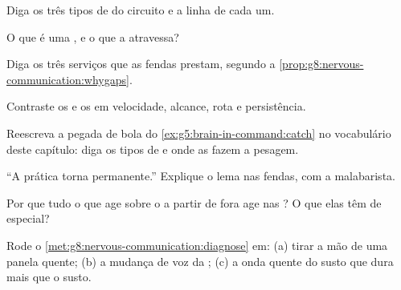 \begin{exercise}[$\star$]\label{exo:g8:nervous-communication:3}
Diga os três tipos de  do circuito e a linha de cada um.
\end{exercise}

\begin{exercise}[$\star$]\label{exo:g8:nervous-communication:4}
O que é uma , e o que a atravessa?
\end{exercise}

\begin{exercise}[$\star$]\label{exo:g8:nervous-communication:5}
Diga os três serviços que as fendas prestam, segundo a
\cref{prop:g8:nervous-communication:whygaps}.
\end{exercise}

\begin{exercise}[$\star$]\label{exo:g8:nervous-communication:6}
Contraste os  e os  em velocidade, alcance, rota e
persistência.
\end{exercise}

\begin{exercise}[$\star\star$]\label{exo:g8:nervous-communication:7}
Reescreva a pegada de bola do \cref{ex:g5:brain-in-command:catch} no
vocabulário deste capítulo: diga os tipos de  e onde as
 fazem a pesagem.
\end{exercise}

\begin{exercise}[$\star\star$]\label{exo:g8:nervous-communication:8}
``A prática torna permanente.'' Explique o lema nas fendas, com a
malabarista.
\end{exercise}

\begin{exercise}[$\star\star$]\label{exo:g8:nervous-communication:9}
Por que tudo o que age sobre o  a partir de fora age
nas ? O que elas têm de especial?
\end{exercise}

\begin{exercise}[$\star\star$]\label{exo:g8:nervous-communication:10}
Rode o \cref{met:g8:nervous-communication:diagnose} em: (a) tirar a
mão de uma panela quente; (b) a mudança de voz da ; (c) a
onda quente do susto que dura mais que o susto.
\end{exercise}

